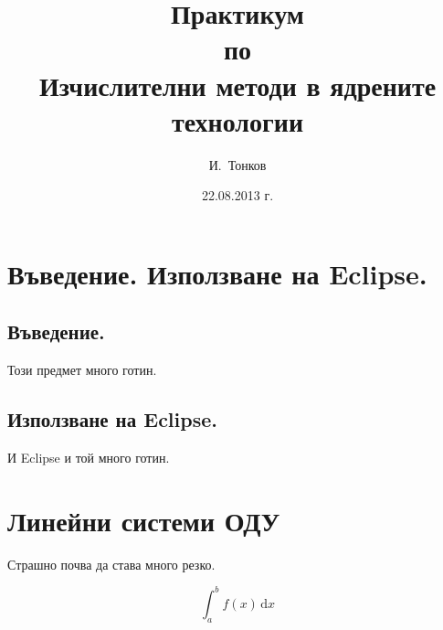 \documentclass[a4paper,11pt]{report}
\title{Практикум\\по\\Изчислителни методи в ядрените технологии}
\author{И.~Тонков}
\date{22.08.2013 г.}
\newcommand{\ud}{\,\mathrm{d}}
\begin{document}
\maketitle
\tableofcontents
\pagebreak
\chapter{Въведение. Използване на Eclipse.}
\section{Въведение.}
Този предмет много готин.
\section{Използване на Eclipse.}
 И Eclipse и той много готин.
\chapter{Линейни системи ОДУ}
Страшно почва да става много резко.

\begin{equation*}
\int_a^b f(x)\ud x
\end{equation*}

\end{document}
